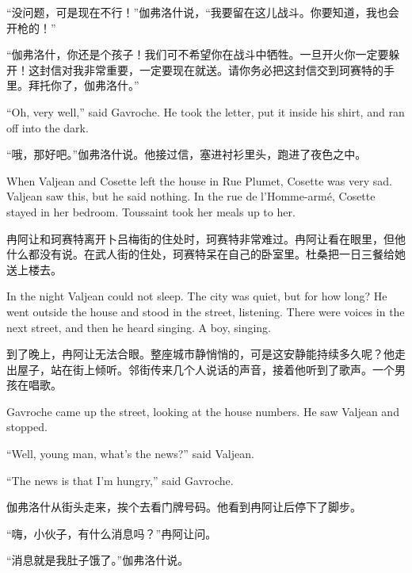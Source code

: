 \documentclass[fontset=ubuntu, zihao=5]{ctexart}
\begin{document}
\begin{paracol}{2}
“没问题，可是现在不行！”伽弗洛什说，“我要留在这儿战斗。你要知道，我也会开枪的！”

“伽弗洛什，你还是个孩子！我们可不希望你在战斗中牺牲。一旦开火你一定要躲开！这封信对我非常重要，一定要现在就送。请你务必把这封信交到珂赛特的手里。拜托你了，伽弗洛什。”

\switchcolumn*

``Oh, very well,'' said Gavroche. He took the letter, put it inside his shirt, and ran off into the dark.

\switchcolumn

“哦，那好吧。”伽弗洛什说。他接过信，塞进衬衫里头，跑进了夜色之中。

\switchcolumn*

\sectionbreak

When Valjean and Cosette left the house in Rue Plumet, Cosette was very sad. Valjean saw this, but he said nothing. In the rue de l'Homme-armé, Cosette stayed in her bedroom. Toussaint took her meals up to her.


\switchcolumn

\sectionbreak

冉阿让和珂赛特离开卜吕梅街的住处时，珂赛特非常难过。冉阿让看在眼里，但他什么都没有说。在武人街的住处，珂赛特呆在自己的卧室里。杜桑把一日三餐给她送上楼去。

\switchcolumn*

In the night Valjean could not sleep. The city was quiet, but for how long? He went outside the house and stood in the street, listening. There were voices in the next street, and then he heard singing. A boy, singing.

\switchcolumn

到了晚上，冉阿让无法合眼。整座城市静悄悄的，可是这安静能持续多久呢？他走出屋子，站在街上倾听。邻街传来几个人说话的声音，接着他听到了歌声。一个男孩在唱歌。

\switchcolumn*

Gavroche came up the street, looking at the house numbers. He saw Valjean and stopped.

``Well, young man, what's the news?'' said Valjean.


``The news is that I'm hungry,'' said Gavroche.

\switchcolumn

伽弗洛什从街头走来，挨个去看门牌号码。他看到冉阿让后停下了脚步。

“嗨，小伙子，有什么消息吗？”冉阿让问。

“消息就是我肚子饿了。”伽弗洛什说。


\end{paracol}
\end{document}
